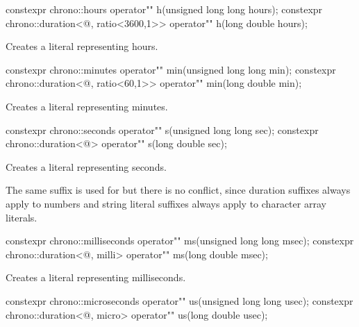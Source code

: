 \documentclass[ebook,11pt,article]{memoir}
\begin{document}
\begin{itemdecl}
constexpr 
chrono::hours operator"" h(unsigned long long hours);
constexpr 
chrono::duration<@\unspec@, ratio<3600,1>> operator"" h(long double hours);
\end{itemdecl}

\begin{itemdescr}
\pnum
\effects
Creates a  literal representing  hours. 
\end{itemdescr}

\begin{itemdecl}
constexpr 
chrono::minutes operator"" min(unsigned long long min);
constexpr 
chrono::duration<@\unspec@, ratio<60,1>> operator"" min(long double min);
\end{itemdecl}

\begin{itemdescr}
\pnum
\effects
Creates a  literal representing  minutes. 
\end{itemdescr}

\begin{itemdecl}
constexpr 
chrono::seconds operator"" s(unsigned long long sec);
constexpr 
chrono::duration<@\unspec@> operator"" s(long double sec);
\end{itemdecl}

\begin{itemdescr}
\pnum
\effects
Creates a  literal representing  seconds. 

\enternote
The same suffix  is used for  but there is no conflict, since duration suffixes always apply to numbers and string literal suffixes always apply to character array literals.
\exitnote
\end{itemdescr}

\begin{itemdecl}
constexpr 
chrono::milliseconds operator"" ms(unsigned long long msec);
constexpr 
chrono::duration<@\unspec@, milli> operator"" ms(long double msec);
\end{itemdecl}

\begin{itemdescr}
\pnum
\effects
Creates a  literal representing  milliseconds. 
\end{itemdescr}

\begin{itemdecl}
constexpr 
chrono::microseconds operator"" us(unsigned long long usec);
constexpr 
chrono::duration<@\unspec@, micro> operator"" us(long double usec);
\end{itemdecl}
\end{document}
